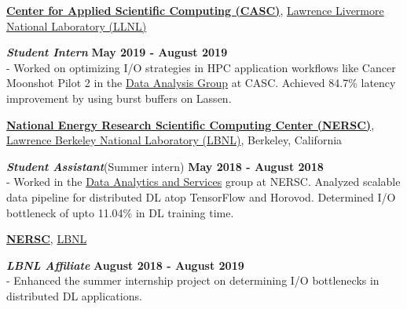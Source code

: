 \documentclass[margin,line]{res}
\begin{document}
\begin{resume}
\vspace{-.3cm}
{\bf \href{https://computing.llnl.gov/casc}{Center for Applied Scientific Computing (CASC)}}, \href{http://www.llnl.gov/}{Lawrence Livermore National Laboratory (LLNL)}

\vspace{-.4cm}
\textbf{{\em Student Intern}} \hfill {\bf May 2019 - August 2019}\\
- Worked on optimizing I/O strategies in HPC application workflows like Cancer Moonshot Pilot 2 in the \href{https://computing.llnl.gov/casc/data-analysis-group}{Data Analysis Group} at CASC. Achieved 84.7\% latency improvement by using burst buffers on Lassen.

\vspace{-.3cm}
{\bf \href{http://www.nersc.gov/}{National Energy Research Scientific Computing Center (NERSC)}}, \href{http://www.lbl.gov/}{Lawrence Berkeley National Laboratory (LBNL)}, Berkeley, California

\vspace{-.4cm}
\textbf{{\em Student Assistant}}(Summer intern) \hfill {\bf May 2018 - August 2018}\\
- Worked in the \href{http://www.nersc.gov/users/data-analytics/}{Data Analytics and Services} group at NERSC. Analyzed scalable data pipeline for distributed DL atop TensorFlow and Horovod. Determined I/O bottleneck of upto 11.04\% in DL training time.

\vspace{-.3cm}
{\bf \href{http://www.nersc.gov/}{NERSC}}, \href{http://www.lbl.gov/}{LBNL}

\vspace{-.4cm}
\textbf{{\em LBNL Affiliate}} \hfill {\bf August 2018 - August 2019}\\
- Enhanced the summer internship project on determining I/O bottlenecks in distributed DL applications.

\vspace*{-.1in}


\end{resume}
\end{document}
